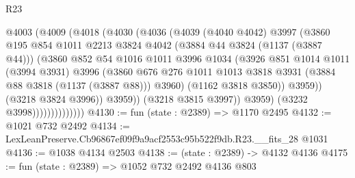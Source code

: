 \begin{lexlean}{R23}
\begin{coremodule}
                            @4003
                              (@4009
                                (@4018
                                  (@4030
                                    (@4036
                                      (@4039
                                        (@4040 @4042)
                                        @3997
                                        (@3860
                                          @195
                                          @854
                                          @1011
                                          @2213
                                          @3824
                                          @4042
                                          (@3884 @44 @3824 (@1137 (@3887 @44)))
                                          (@3860
                                            @852
                                            @54
                                            @1016
                                            @1011
                                            @3996
                                            @1034
                                            (@3926
                                              @851
                                              @1014
                                              @1011
                                              (@3994 @3931)
                                              @3996
                                              (@3860
                                                @676
                                                @276
                                                @1011
                                                @1013
                                                @3818
                                                @3931
                                                (@3884 @88 @3818 (@1137 (@3887 @88)))
                                                @3960)
                                              (@1162 @3818 @3850))
                                            @3959))
                                        (@3218 @3824 @3996))
                                      @3959))
                                  (@3218 @3815 @3997))
                                @3959)
                              (@3232 @3998))))))))))))))
@4130 := fun (state : @2389) => @1170 @2495
@4132 := @1021 @732 @2492
@4134 := LexLeanPreserve.Cb96867ef09f9a9acf2553c95b522f9db.R23.__fits_28 @1031
@4136 := @1038 @4134 @2503
@4138 := (state : @2389) -> @4132 @4136
@4175 := fun (state : @2389) =>
  @1052
    @732
    @2492
    @4136
    @803

\end{coremodule}
\end{lexlean}
